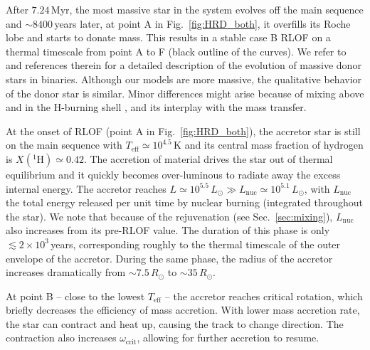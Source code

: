 \documentclass[twocolumn,twocolappendix,trackchanges]{aastex63}
\DeclareRobustCommand{\Figref}[1]{Fig.~\ref{#1}}
\DeclareRobustCommand{\Secref}[1]{Sec.~\ref{#1}}
\begin{document}
After $7.24$\,Myr, the most massive star in the system
 evolves off the main sequence and $\sim{}8400$\,years later, at
point A in \Figref{fig:HRD_both}, it overfills its Roche lobe and starts to donate mass. This
results in a stable case B RLOF on a thermal timescale from point A to
F (black outline of the curves).
We refer to \cite{gotberg:17, klencki:20, laplace:21,
blagorodnova:21} and references therein for a detailed description
of the evolution of massive donor stars in binaries.  Although our
models are more massive, the qualitative behavior of the donor star
is similar. Minor differences might arise because of mixing above
and in the H-burning shell \citep[e.g.,][]{schootemeijer:19,
klencki:21}, and its interplay with the mass transfer.

At the onset of RLOF (point A in \Figref{fig:HRD_both}), the accretor
star is still on the main sequence with
$T_\mathrm{eff}\simeq10^{4.5}$\,K and its central mass fraction of
hydrogen is $X(^1\mathrm{H})\simeq 0.42$. The accretion of material
drives the star out of thermal equilibrium and it quickly becomes
over-luminous to radiate away the excess internal energy. The accretor
reaches
$L\simeq10^{5.5}\,L_\odot\gg L_\mathrm{nuc}\simeq 10^{5.1}\,L_\odot$,
with $L_\mathrm{nuc}$ the total energy released per unit time by
nuclear burning (integrated throughout the star). We note that because
of the rejuvenation (see \Secref{sec:mixing}), $L_\mathrm{nuc}$ also
increases from its pre-RLOF value. The
duration of this phase is only $\lesssim 2\times 10^3$\,years,
corresponding roughly to the thermal timescale of the outer envelope
of the accretor. During the same phase, the radius of the
accretor increases dramatically from $\sim{}7.5\,R_\odot$ to
$\sim{}35\,R_\odot$.

At point B -- close to the lowest $T_\mathrm{eff}$ --
the accretor reaches critical rotation, which briefly decreases the
efficiency of mass accretion. With lower mass accretion rate, the star can contract and heat up, causing the track to change direction. The contraction also increases
$\omega_\mathrm{crit}$, allowing for further accretion to resume.
\end{document}
